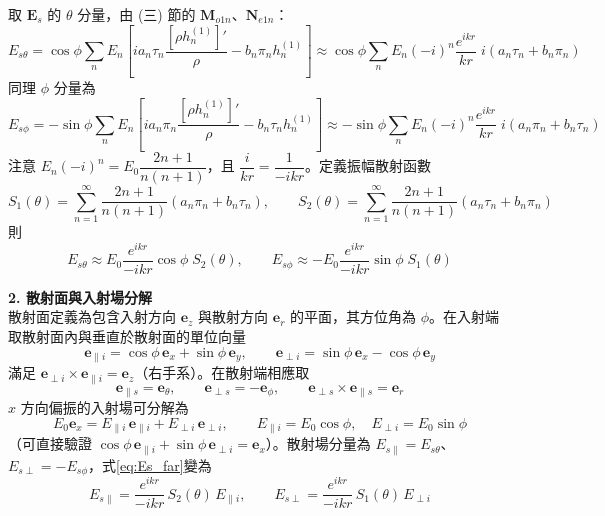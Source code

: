 \medskip
取 $\mathbf{E}_s$ 的 $\theta$ 分量，由 (三) 節的 $\mathbf{M}_{o1n}$、$\mathbf{N}_{e1n}$：
\begin{equation}
    E_{s\theta} = \cos\phi \sum_n E_n \left[ i a_n \tau_n \frac{\left[\rho h_n^{(1)}\right]'}{\rho} - b_n \pi_n h_n^{(1)} \right] \approx \cos\phi \sum_n E_n (-i)^n \frac{e^{ikr}}{kr}\; i \left( a_n \tau_n + b_n \pi_n \right)
\end{equation}
同理 $\phi$ 分量為
\begin{equation}
    E_{s\phi} = -\sin\phi \sum_n E_n \left[ i a_n \pi_n \frac{\left[\rho h_n^{(1)}\right]'}{\rho} - b_n \tau_n h_n^{(1)} \right] \approx -\sin\phi \sum_n E_n (-i)^n \frac{e^{ikr}}{kr}\; i \left( a_n \pi_n + b_n \tau_n \right)
\end{equation}
注意 $E_n (-i)^n = E_0 \dfrac{2n+1}{n(n+1)}$，且 $\dfrac{i}{kr} = \dfrac{1}{-ikr}$。定義振幅散射函數
\begin{equation}
    S_1(\theta) = \sum_{n=1}^{\infty} \frac{2n+1}{n(n+1)} \left( a_n \pi_n + b_n \tau_n \right), \qquad S_2(\theta) = \sum_{n=1}^{\infty} \frac{2n+1}{n(n+1)} \left( a_n \tau_n + b_n \pi_n \right) \label{eq:S1S2}
\end{equation}
則
\begin{equation}
    E_{s\theta} \approx E_0 \frac{e^{ikr}}{-ikr} \cos\phi\; S_2(\theta), \qquad E_{s\phi} \approx -E_0 \frac{e^{ikr}}{-ikr} \sin\phi\; S_1(\theta) \label{eq:Es_far}
\end{equation}

\textbf{2. 散射面與入射場分解}\\
散射面定義為包含入射方向 $\mathbf{e}_z$ 與散射方向 $\mathbf{e}_r$ 的平面，其方位角為 $\phi$。在入射端取散射面內與垂直於散射面的單位向量
\begin{equation}
    \mathbf{e}_{\parallel i} = \cos\phi\, \mathbf{e}_x + \sin\phi\, \mathbf{e}_y, \qquad \mathbf{e}_{\perp i} = \sin\phi\, \mathbf{e}_x - \cos\phi\, \mathbf{e}_y
\end{equation}
滿足 $\mathbf{e}_{\perp i} \times \mathbf{e}_{\parallel i} = \mathbf{e}_z$（右手系）。在散射端相應取
\begin{equation}
    \mathbf{e}_{\parallel s} = \mathbf{e}_{\theta}, \qquad \mathbf{e}_{\perp s} = -\mathbf{e}_{\phi}, \qquad \mathbf{e}_{\perp s} \times \mathbf{e}_{\parallel s} = \mathbf{e}_r
\end{equation}
$x$ 方向偏振的入射場可分解為
\begin{equation}
    E_0 \mathbf{e}_x = E_{\parallel i}\, \mathbf{e}_{\parallel i} + E_{\perp i}\, \mathbf{e}_{\perp i}, \qquad E_{\parallel i} = E_0 \cos\phi, \quad E_{\perp i} = E_0 \sin\phi
\end{equation}
（可直接驗證 $\cos\phi\, \mathbf{e}_{\parallel i} + \sin\phi\, \mathbf{e}_{\perp i} = \mathbf{e}_x$）。散射場分量為 $E_{s\parallel} = E_{s\theta}$、$E_{s\perp} = -E_{s\phi}$，式\eqref{eq:Es_far}變為
\begin{equation}
    E_{s\parallel} = \frac{e^{ikr}}{-ikr}\, S_2(\theta)\, E_{\parallel i}, \qquad E_{s\perp} = \frac{e^{ikr}}{-ikr}\, S_1(\theta)\, E_{\perp i} \label{eq:Es_pp}
\end{equation}

